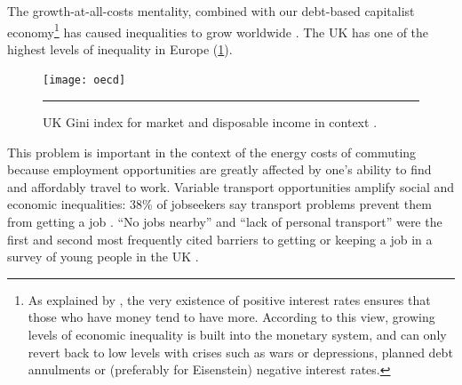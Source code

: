 The growth-at-all-costs mentality, combined with our debt-based
capitalist economy\footnote{As explained by \citet{Eisenstein2011},
the very existence of positive interest rates ensures that those who
have money tend to have more. According to this view, growing
levels of economic inequality is built into the monetary system,
and can only revert back to low levels with crises such as
wars or depressions, planned debt annulments or
(preferably for Eisenstein) negative interest rates.}
has caused inequalities to grow worldwide
\citep{OECD2011}. The UK has one of the highest levels of
inequality in Europe (\cref{fig:ineqs}).

\begin{figure}[htbp]
  \centerline{
    \texttt{[image: oecd]}}
    \rule{35em}{0.5pt}
  \caption{UK Gini index for market and disposable income
  in context \citep{OECD2011}.}
  \label{fig:ineqs}
\end{figure}

This problem is important in the context of the energy costs
of commuting because employment opportunities are greatly
affected by one's ability to find and affordably travel to work.
Variable transport opportunities amplify social and economic
inequalities: 38\% of jobseekers say transport problems prevent
them from getting a job \citep{SocialExclusionUnit2002}⁠.  ``No jobs nearby'' and
``lack of personal transport'' were the first and second most
frequently cited barriers to getting or keeping a job in a survey
of young people in the UK \citep{Bryson2000a}⁠.

